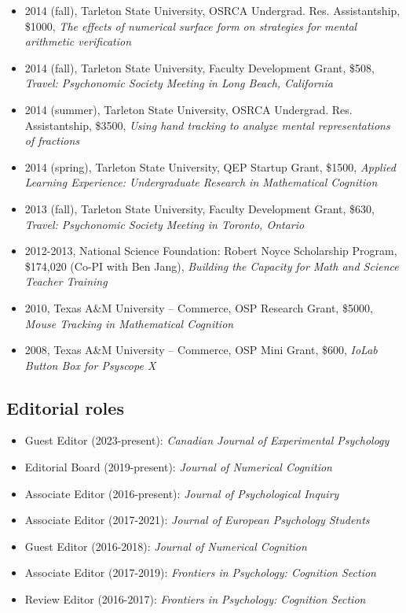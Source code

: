 \documentclass[article,10pt]{article}
\begin{document}
\begin{itemize}
\item 2014 (fall), Tarleton State University, OSRCA Undergrad. Res. Assistantship, \$1000, \emph{The effects of numerical surface form on strategies for mental arithmetic verification}
\item 2014 (fall), Tarleton State University, Faculty Development Grant, \$508, \emph{Travel: Psychonomic Society Meeting in Long Beach, California}
\item 2014 (summer), Tarleton State University, OSRCA Undergrad. Res. Assistantship, \$3500, \emph{Using hand tracking to analyze mental representations of fractions}
\item 2014 (spring), Tarleton State University, QEP Startup Grant, \$1500, \emph{Applied Learning Experience: Undergraduate Research in Mathematical Cognition}
\item 2013 (fall), Tarleton State University, Faculty Development Grant, \$630, \emph{Travel: Psychonomic Society Meeting in Toronto, Ontario}
\item 2012-2013, National Science Foundation: Robert Noyce Scholarship Program, \$174,020 (Co-PI with Ben Jang), \emph{Building the Capacity for Math and Science Teacher Training}
\item 2010, Texas A\&M University – Commerce, OSP Research Grant, \$5000, \emph{Mouse Tracking in Mathematical Cognition}
\item 2008, Texas A\&M University – Commerce, OSP Mini Grant, \$600, \emph{IoLab Button Box for Psyscope X}
\end{itemize}

\subsection*{Editorial roles}
\label{sec:org412a22d}
\begin{itemize}
\item Guest Editor (2023-present): \emph{Canadian Journal of Experimental Psychology}
\item Editorial Board (2019-present): \emph{Journal of Numerical Cognition}
\item Associate Editor (2016-present): \emph{Journal of Psychological Inquiry}
\item Associate Editor (2017-2021): \emph{Journal of European Psychology Students}
\item Guest Editor (2016-2018): \emph{Journal of Numerical Cognition}
\item Associate Editor (2017-2019): \emph{Frontiers in Psychology: Cognition Section}
\item Review Editor (2016-2017): \emph{Frontiers in Psychology: Cognition Section}
\end{itemize}
\end{document}
